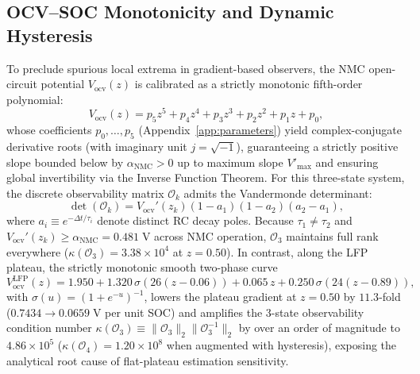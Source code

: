 \documentclass[11pt,a4paper]{article}
\begin{document}
\subsection{OCV--SOC Monotonicity and Dynamic Hysteresis}
To preclude spurious local extrema in gradient-based observers, the NMC open-circuit potential $V_{\text{ocv}}(z)$ is calibrated as a strictly monotonic fifth-order polynomial:
\begin{equation}\label{eqn:ocv_poly}
V_{\text{ocv}}(z) = p_5 z^5 + p_4 z^4 + p_3 z^3 + p_2 z^2 + p_1 z + p_0,
\end{equation}
whose coefficients $p_0,\dots,p_5$ (Appendix~\ref{app:parameters}) yield complex-conjugate derivative roots (with imaginary unit $j = \sqrt{-1}$), guaranteeing a strictly positive slope bounded below by $\alpha_{\text{NMC}} > 0$ up to maximum slope $V'_{\max}$ and ensuring global invertibility via the Inverse Function Theorem. For this three-state system, the discrete observability matrix $\mathcal{O}_k$ admits the Vandermonde determinant:
\begin{equation}\label{eqn:det_obs}
\det(\mathcal{O}_k) = V_{\text{ocv}}'(z_k) (1 - a_1)(1 - a_2)(a_2 - a_1),
\end{equation}
where $a_i \equiv e^{-\Delta t/\tau_i}$ denote distinct RC decay poles. Because $\tau_1 \ne \tau_2$ and $V_{\text{ocv}}'(z_k) \ge \alpha_{\text{NMC}} = 0.481\;\mathrm{V}$ across NMC operation, $\mathcal{O}_3$ maintains full rank everywhere ($\kappa(\mathcal{O}_3) = 3.38 \times 10^4$ at $z=0.50$). In contrast, along the LFP plateau, the strictly monotonic smooth two-phase curve
\begin{equation}\label{eqn:ocv_lfp}
V_{\text{ocv}}^{\text{LFP}}(z) = 1.950 + 1.320\,\sigma(26(z - 0.06)) + 0.065\,z + 0.250\,\sigma(24(z - 0.89)),
\end{equation}
with $\sigma(u) = (1 + e^{-u})^{-1}$, lowers the plateau gradient at $z=0.50$ by $11.3$-fold ($0.7434 \rightarrow 0.0659\;\mathrm{V}$ per unit SOC) and amplifies the 3-state observability condition number $\kappa(\mathcal{O}_3) \equiv \|\mathcal{O}_3\|_2 \|\mathcal{O}_3^{-1}\|_2$ by over an order of magnitude to $4.86 \times 10^5$ ($\kappa(\mathcal{O}_4) = 1.20 \times 10^8$ when augmented with hysteresis), exposing the analytical root cause of flat-plateau estimation sensitivity.
\end{document}
